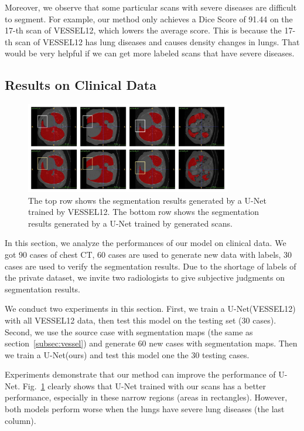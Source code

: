 \documentclass{article}
\begin{document}
Moreover, we observe that some particular scans with severe diseases are difficult to segment. For example, our method only achieves a Dice Score of 91.44 on the 17-th scan of VESSEL12, which lowers the average score. This is because the 17-th scan of VESSEL12 has lung diseases and causes density changes in lungs. That would be very helpful if we can get more labeled scans that have severe diseases.

\subsection{Results on Clinical Data}
\label{subsec:clinical}
\begin{figure}[t]
    \centerline{\includegraphics[width=90mm]{lungs.pdf}}
    \vspace{-0.5cm}
    \caption{The top row shows the segmentation results generated by a U-Net trained by VESSEL12. The bottom row shows the segmentation results generated by a U-Net trained by generated scans. 
    }
    \vspace{-0.3cm}
    \label{lungs}
    \end{figure}
In this section, we analyze the performances of our model on clinical data. We got 90 cases of chest CT, 60 cases are used to generate new data with labels, 30 cases are used to verify the segmentation results. Due to the shortage of labels of the private dataset, we invite two radiologists to give subjective judgments on segmentation results.

We conduct two experiments in this section.
First, we train a U-Net(VESSEL12) with all VESSEL12 data, then test this model on the testing set (30 cases).
Second, we use the source case with segmentation maps (the same as section~\ref{subsec:vessel}) and generate 60 new cases with segmentation maps. Then we train a U-Net(ours) and test this model one the 30 testing cases.

Experiments demonstrate that our method can improve the performance of U-Net. Fig.~\ref{lungs} clearly shows that U-Net trained with our scans has a better performance, especially in these narrow regions (areas in rectangles). However, both models perform worse when the lungs have severe lung diseases (the last column).
\end{document}
